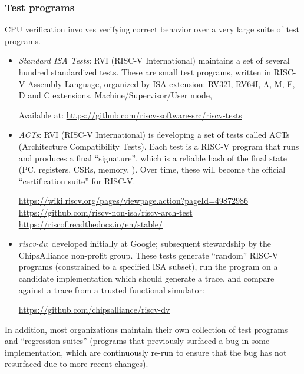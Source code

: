 
\begin{frame}[fragile]
\frametitle{Test programs}

\footnotesize

CPU verification involves verifying correct behavior over a very large suite of test programs.

\begin{itemize}

  \item \emph{Standard ISA Tests}: RVI (RISC-V International)
        maintains a set of several hundred standardized tests.  These
        are small test programs, written in RISC-V Assembly Language,
        organized by ISA extension: RV32I, RV64I, A, M, F, D and C
        extensions, Machine/Supervisor/User mode, {\etc}

        Available at: \url{https://github.com/riscv-software-src/riscv-tests}

  \vx

  \item \emph{ACTs}: RVI (RISC-V International) is developing a set of
        tests called ACTs (Architecture Compatibility Tests).  Each
        test is a RISC-V program that runs and produces a final
        ``signature'', which is a reliable hash of the final state
        (PC, registers, CSRs, memory, {\etc}).  Over time, these will
        become the official ``certification suite'' for RISC-V.

        \begin{tabbing}
        \hmm \= \url{https://wiki.riscv.org/pages/viewpage.action?pageId=49872986} \\
             \> \url{https://github.com/riscv-non-isa/riscv-arch-test} \\
             \> \url{https://riscof.readthedocs.io/en/stable/}
        \end{tabbing}

  \vx

  \item \emph{riscv-dv}: developed initially at Google; subsequent
        stewardship by the ChipsAlliance non-profit group.  These
        tests generate ``random'' RISC-V programs (constrained to a
        specified ISA subset), run the program on a candidate
        implementation which should generate a trace, and compare
        against a trace from a trusted functional simulator:

        \begin{tabbing}
        \hmm \= \url{https://github.com/chipsalliance/riscv-dv}
        \end{tabbing}

\end{itemize}

\vx

In addition, most organizations maintain their own collection of test
programs and ``regression suites'' (programs that previously surfaced
a bug in some implementation, which are continuously re-run to ensure
that the bug has not resurfaced due to more recent changes).

\end{frame}


